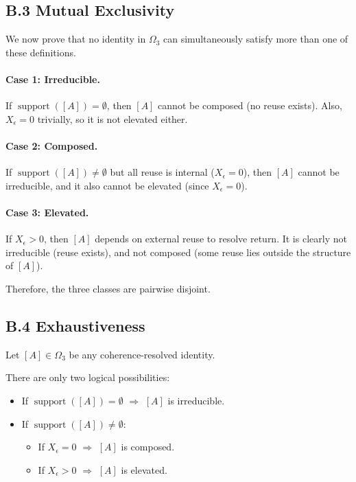 \subsection*{B.3 \quad Mutual Exclusivity}

We now prove that no identity in $\Omega_3$ can simultaneously satisfy more than one of these definitions.

\paragraph{Case 1: Irreducible.} If $\operatorname{support}([A]) = \emptyset$, then $[A]$ cannot be composed (no reuse exists). Also, $X_\epsilon = 0$ trivially, so it is not elevated either.

\paragraph{Case 2: Composed.} If $\operatorname{support}([A]) \ne \emptyset$ but all reuse is internal ($X_\epsilon = 0$), then $[A]$ cannot be irreducible, and it also cannot be elevated (since $X_\epsilon = 0$).

\paragraph{Case 3: Elevated.} If $X_\epsilon > 0$, then $[A]$ depends on external reuse to resolve return. It is clearly not irreducible (reuse exists), and not composed (some reuse lies outside the structure of $[A]$).

Therefore, the three classes are pairwise disjoint.

\subsection*{B.4 \quad Exhaustiveness}

Let $[A] \in \Omega_3$ be any coherence-resolved identity.

There are only two logical possibilities:
\begin{itemize}
    \item If $\operatorname{support}([A]) = \emptyset$ $\Rightarrow$ $[A]$ is irreducible.
    \item If $\operatorname{support}([A]) \ne \emptyset$:
    \begin{itemize}
        \item If $X_\epsilon = 0$ $\Rightarrow$ $[A]$ is composed.
        \item If $X_\epsilon > 0$ $\Rightarrow$ $[A]$ is elevated.
    \end{itemize}
\end{itemize}

